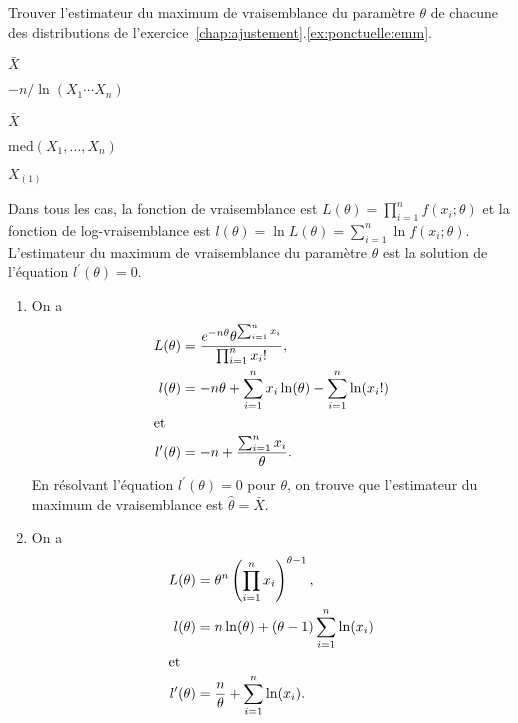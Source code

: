 
\begin{exercice}
  \label{ex:ponctuelle:emv}
  Trouver l'estimateur du maximum de vraisemblance du paramètre
  $\theta$ de chacune des distributions de
  l'exercice~\ref{chap:ajustement}.\ref{ex:ponctuelle:emm}.
  \begin{rep}
    \begin{inparaenum}
    \item $\bar{X}$
    \item $-n/\ln(X_1 \cdots X_n)$
    \item $\bar{X}$
    \item $\text{med}(X_1, \dots, X_n)$
    \item $X_{(1)}$
    \end{inparaenum}
  \end{rep}
  \begin{sol}
    Dans tous les cas, la fonction de vraisemblance est $L(\theta) =
    \prod_{i = 1}^n f(x_i; \theta)$ et la fonction de
    log-vraisemblance est $l(\theta) = \ln L(\theta) = \sum_{i = 1}^n
    \ln f(x_i; \theta)$. L'estimateur du maximum de vraisemblance du
    paramètre $\theta$ est la solution de l'équation $l^\prime(\theta)
    = 0$.
    \begin{enumerate}
    \item On a
      \begin{align*}
        L(\theta) &= \frac{e^{-n\theta} \theta^{\sum_{i=1}^n x_i}}{%
          \prod_{i=1}^n x_i!}, \\
        l(\theta) &= -n \theta  + \sum_{i = 1}^n x_i \ln(\theta)
        - \sum_{i=1}^n \ln(x_i!) \\
        \intertext{et}
        l^\prime(\theta) &= -n + \frac{\sum_{i = 1}^n x_i}{\theta}.
      \end{align*}
      En résolvant l'équation $l^\prime(\theta) = 0$ pour $\theta$, on
      trouve que l'estimateur du maximum de vraisemblance est
      $\hat{\theta} = \bar{X}$.
    \item On a
      \begin{align*}
        L(\theta) &= \theta^n
        \left(
          \prod_{i = 1}^n x_i
        \right)^{\theta - 1}, \\
        l(\theta) &= n \ln(\theta) +
        (\theta - 1) \sum_{i = 1}^n \ln(x_i) \\
        \intertext{et}
        l^\prime(\theta) &= \frac{n}{\theta} +
        \sum_{i = 1}^n \ln(x_i).
      \end{align*}

\end{enumerate}
\end{sol}
\end{exercice}

